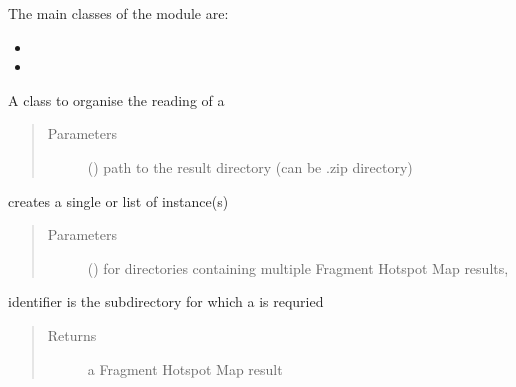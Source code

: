\documentclass[letterpaper,10pt,english]{sphinxmanual}
\begin{document}
The main classes of the  module are:
\begin{itemize}
\item {} 

\item {} 

\end{itemize}

\begin{fulllineitems}
\label{\detokenize{hs_io_api:hotspots.hs_io.HotspotReader}}
A class to organise the reading of a 
\begin{quote}\begin{description}
\item[{Parameters}] \leavevmode
{} () \textendash{} path to the result directory (can be .zip directory)

\end{description}\end{quote}

\begin{fulllineitems}
\label{\detokenize{hs_io_api:hotspots.hs_io.HotspotReader.read}}
creates a single or list of  instance(s)
\begin{quote}\begin{description}
\item[{Parameters}] \leavevmode
{} () \textendash{} for directories containing multiple Fragment Hotspot Map results,

\end{description}\end{quote}

identifier is the subdirectory for which a  is requried
\begin{quote}\begin{description}
\item[{Returns}] \leavevmode
{} a Fragment Hotspot Map result


\end{description}
\end{quote}
\end{fulllineitems}
\end{fulllineitems}
\end{document}

